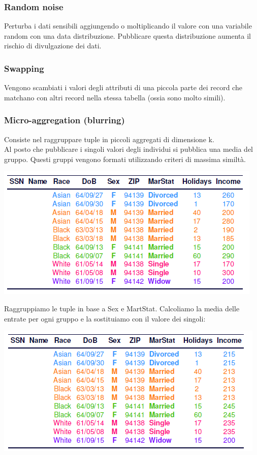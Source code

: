 \subsubsection{Random noise}
Perturba i dati sensibili aggiungendo o moltiplicando il valore con una variabile random con una data distribuzione. Pubblicare questa distribuzione aumenta il rischio di divulgazione dei dati.

\subsubsection{Swapping}
Vengono scambiati i valori degli attributi di una piccola parte dei record che matchano con altri record nella stessa tabella (ossia sono molto simili).

\subsubsection{Micro-aggregation (blurring)}
Consiste nel raggruppare tuple in piccoli aggregati di dimensione k. \\ 
Al posto che pubblicare i singoli valori degli individui si pubblica una media del gruppo. Questi gruppi vengono formati utilizzando criteri di massima similtà.
\begin{center}
    \includegraphics[scale=0.5]{img/blurring1.png}
\end{center}
Raggruppiamo le tuple in base a Sex e MartStat. Calcoliamo la media delle entrate per ogni gruppo e la sostituiamo con il valore dei singoli:
\begin{center}
    \includegraphics[scale=0.5]{img/blurring2.png}
\end{center}

